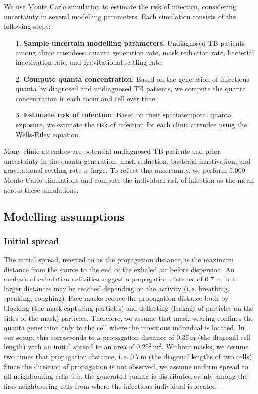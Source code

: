 \documentclass[fleqn,11pt]{wlscirep_supp}
\newcommand\ie{i.\,e.\xspace}
\begin{document}
We use Monte Carlo simulation to estimate the risk of infection, considering uncertainty in several modelling parameters. Each simulation consists of the following steps:
\begin{itemize}
    \item[1.] \textbf{Sample uncertain modelling parameters}: Undiagnosed TB patients among clinic attendees, quanta generation rate, mask reduction rate, bacterial inactivation rate, and gravitational settling rate.
    \item[2.] \textbf{Compute quanta concentration}: Based on the generation of infectious quanta by diagnosed and undiagnosed TB patients, we compute the quanta concentration in each room and cell over time.
    \item[3.] \textbf{Estimate risk of infection}: Based on their spatiotemporal quanta exposure, we estimate the risk of infection for each clinic attendee using the Wells-Riley equation.
\end{itemize}

Many clinic attendees are potential undiagnosed TB patients and prior uncertainty in the quanta generation, mask reduction, bacterial inactivation, and gravitational settling rate is large. To reflect this uncertainty, we perform 5,000 Monte Carlo simulations and compute the individual risk of infection as the mean across these simulations.  

\subsection{Modelling assumptions}\label{sec:priors}

\subsubsection{Initial spread}

The initial spread, referred to as the propagation distance, is the maximum distance from the source to the end of the exhaled air before dispersion. An analysis of exhalation activities suggest a propagation distance of 0.7\,m\cite{Tang2013PLoSOne}, but larger distances may be reached depending on the activity (\ie breathing, speaking, coughing). Face masks reduce the propagation distance both by blocking (the mask capturing particles) and deflecting (leakage of particles on the sides of the mask) particles\cite{Tang2009RoyalInt,Hui2012PLoSOne,Mansour2013AerosolMed}. Therefore, we assume that mask wearing confines the quanta generation only to the cell where the infectious individual is located. In our setup, this corresponds to a propagation distance of 0.35\,m (the diagonal cell length) with an initial spread to an area of 0.25$^2$\,m$^2$. Without masks, we assume two times that propagation distance, \ie 0.7\,m (the diagonal lengths of two cells)\cite{Tang2013PLoSOne}. Since the direction of propagation is not observed, we assume uniform spread to all neighbouring cells, \ie the generated quanta is distributed evenly among the first-neighbouring cells from where the infectious individual is located.
\end{document}
